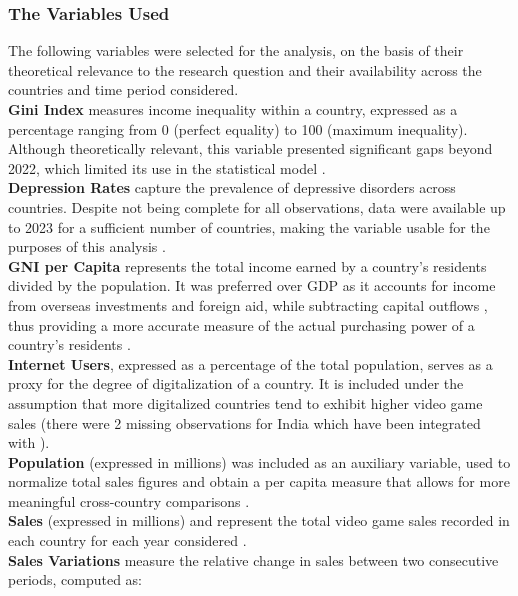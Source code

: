 \subsubsection{The Variables Used}
The following variables were selected for the analysis, on the basis of 
their theoretical relevance to the research question and their availability 
across the countries and time period considered.\\
\textbf{Gini Index} measures income inequality within a country, expressed 
as a percentage ranging from 0 (perfect equality) to 100 (maximum inequality). 
Although theoretically relevant, this variable presented significant 
gaps beyond 2022, which limited its use in the statistical model \citep{Gini}.\\
\textbf{Depression Rates} capture the prevalence of depressive disorders 
across countries. Despite not being complete for all observations, data 
were available up to 2023 for a sufficient number of countries, making 
the variable usable for the purposes of this analysis \citep{ihme_depression_vizhub}.\\
\textbf{GNI per Capita} represents the total income earned by a country's 
residents divided by the population. It was preferred over GDP as it 
accounts for income from overseas investments and foreign aid, while 
subtracting capital outflows \citep{investopedia_gni}, thus providing a 
more accurate measure of the actual purchasing power of a country's residents \citep{worldbank_gni_per_capita}.\\
\textbf{Internet Users}, expressed as a percentage of the total population, 
serves as a proxy for the degree of digitalization of a country. It is 
included under the assumption that more digitalized countries tend to 
exhibit higher video game sales \citep{worldbank_internet_users} (there were 2 missing observations for India which have been integrated with \cite{statista_internet_users_india}).\\
\textbf{Population} (expressed in millions) was included as an auxiliary 
variable, used to normalize total sales figures and obtain a per capita 
measure that allows for more meaningful cross-country comparisons \citep{worldbank_population_total}.\\
\textbf{Sales} (expressed in millions) and represent the total video game sales recorded in each 
country for each year considered \citep{factset_equity_data}.\\
\textbf{Sales Variations} measure the relative change in sales between 
two consecutive periods, computed as:
